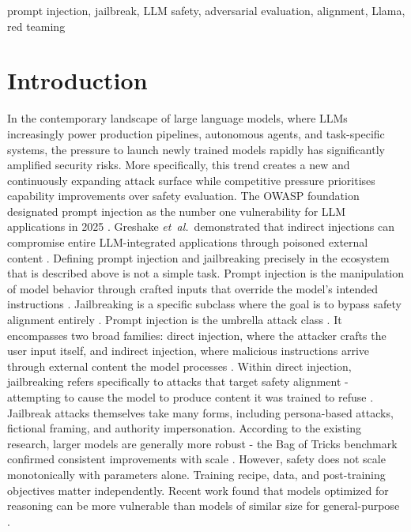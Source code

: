 \documentclass[conference]{IEEEtran}
\newcommand{\etal}{\textit{et~al.}}
\begin{document}
\begin{IEEEkeywords}
prompt injection, jailbreak, LLM safety, adversarial evaluation,
alignment, Llama, red teaming
\end{IEEEkeywords}

\section{Introduction}
\label{sec:intro}

\IEEEPARstart 
In the contemporary landscape of large language models, where LLMs increasingly power production pipelines, autonomous agents, and task-specific systems, the pressure to launch newly trained models rapidly has significantly amplified security risks. More specifically, this trend creates a new and continuously expanding attack surface while competitive pressure prioritises capability improvements over safety evaluation.
The OWASP foundation designated prompt injection as the number one vulnerability for LLM applications in 2025 \cite{owasp2025llm}. 
Greshake \etal\ demonstrated that indirect injections can compromise entire LLM-integrated applications through poisoned external 
content \cite{greshake2023indirect}.
Defining prompt injection and jailbreaking precisely in the ecosystem that is described above is not a simple task. Prompt injection 
is the manipulation of model behavior through crafted inputs that override the model's intended instructions 
\cite{perez2022injection}. Jailbreaking is a specific subclass where the goal is to bypass safety alignment entirely 
\cite{wei2023jailbroken}.
Prompt injection is the umbrella attack class \cite{perez2022injection}. It encompasses two broad families: direct injection, where 
the attacker crafts the user input itself, and indirect injection, where malicious instructions arrive through external content the 
model processes \cite{greshake2023indirect}. Within direct injection, jailbreaking refers specifically to attacks that target safety 
alignment - attempting to cause the model to produce content it was trained to refuse \cite{wei2023jailbroken}. Jailbreak attacks 
themselves take many forms, including persona-based attacks, fictional framing, and authority impersonation.
According to the existing research, larger models are generally more robust - the Bag of Tricks benchmark confirmed consistent improvements with scale \cite{xu2024bagoftricks}. However, safety does not scale monotonically with parameters alone. Training recipe, data, and post-training objectives matter independently. Recent work found that models optimized for reasoning can be more vulnerable than models of similar size for general-purpose \cite{zhang2025whatmatters}.
\end{document}
